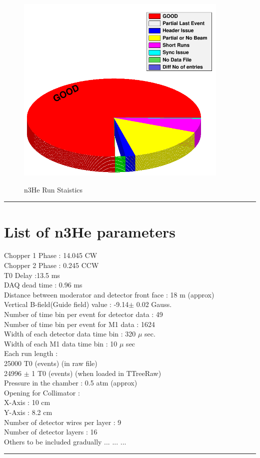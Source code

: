 \documentclass[12pt]{article}
\begin{document}
\begin{figure}[htb]
\centering
\includegraphics[width=4in]{n3he_run_status.png}\\
\caption{n3He Run Staistics}\label{f5}
\end{figure}   

\noindent
{\color{red} \rule{\linewidth}{1mm} }

\newpage
\section{List of n3He parameters}

Chopper 1 Phase : 14.045 CW \\
Chopper 2 Phase : 0.245 CCW \\
T0 Delay :13.5 ms \\
DAQ dead time : 0.96 ms \\
Distance between moderator and detector front face : 18 m (approx) \\
Vertical B-field(Guide field) value : -9.14$\pm$ 0.02 Gauss.\\
Number of time bin per event for detector data : 49\\
Number of time bin per event for M1 data : 1624\\
Width of each detector data time bin : 320 $\mu$ sec.\\
Width of each M1 data time bin : 10 $\mu$ sec\\
Each run length : \\
\hspace{5cm} 25000 T0 (events) (in raw file)\\
\hspace{5cm} 24996 $\pm$ 1 T0 (events) (when loaded in TTreeRaw)\\
Pressure in the chamber : 0.5 atm (approx) \\
Opening for Collimator :  \\
\hspace{5cm} X-Axis : 10 cm \\
\hspace{5cm} Y-Axis : 8.2 cm \\
Number of detector wires per layer : 9 \\
Number of detector layers : 16 \\


Others to be included gradually ... ... ... \\



\noindent
{\color{red} \rule{\linewidth}{1mm} }
\end{document}
